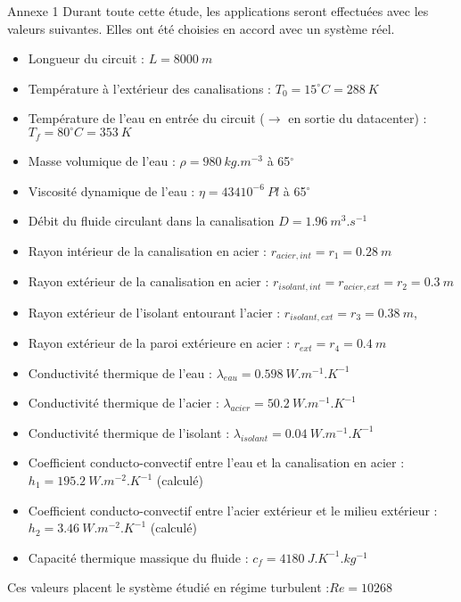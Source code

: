 \documentclass[hyperref={pdfpagelabels=false}]{beamer}
\begin{document}
\begin{frame}{Annexe 1 {\textcolor{ultramarine}{\hyperlink{t1}{}}} }\label{a1}
Durant toute cette étude, les applications seront effectuées avec les valeurs suivantes. Elles ont été choisies en accord avec un système réel. 
\begin{itemize}
\item Longueur du circuit : $L=8000~m$
\item Température à l'extérieur des canalisations : $T_0 = 15^{\circ}C = 288~K$
\item Température de l'eau en entrée du circuit ($\rightarrow$ en sortie du datacenter) : $T_f = 80^{\circ}C = 353~K$
\item Masse volumique de l'eau : $\rho = 980~kg.m^{-3} $ à 65$^{\circ}$
\item Viscosité dynamique de l'eau : $\eta = 434 10^{-6}~Pl$ à 65$^{\circ}$
\item Débit du fluide circulant dans la canalisation $D=1.96~m^{3}.s^{-1}$
\item Rayon intérieur de la canalisation en acier : $r_{acier,int} = r_1=0.28~m$
\item Rayon extérieur de la canalisation en acier : $r_{isolant,int} = r_{acier,ext} = r_2 = 0.3~m $
\end{itemize}
\end{frame}

\begin{frame}
\begin{itemize}
\item Rayon extérieur de l'isolant entourant l'acier : $r_{isolant,ext} = r_3 = 0.38 ~m$, 
\item Rayon extérieur de la paroi extérieure en acier : $r_{ext} = r_4 = 0.4 ~m$
\item Conductivité thermique de l'eau : $\lambda_{eau} = 0.598~W.m^{-1}.K^{-1} $
\item Conductivité thermique de l'acier : $\lambda_{acier} = 50.2~W.m^{-1}.K^{-1} $
\item Conductivité thermique de l'isolant : $\lambda_{isolant} = 0.04~W.m^{-1}.K^{-1} $
\item Coefficient conducto-convectif entre l'eau et la canalisation en acier : $h_1 = 195.2 ~W.m^{-2}.K^{-1}$ (calculé)
\item Coefficient conducto-convectif entre l'acier extérieur et le milieu extérieur : $h_2 = 3.46 ~W.m^{-2}.K^{-1}$ (calculé)
\item Capacité thermique massique du fluide : $c_f = 4 180~ J.K^{-1}.kg^{-1}$
\end{itemize}
Ces valeurs placent le système étudié en régime turbulent :$Re = 10268$
\end{frame}
\end{document}
